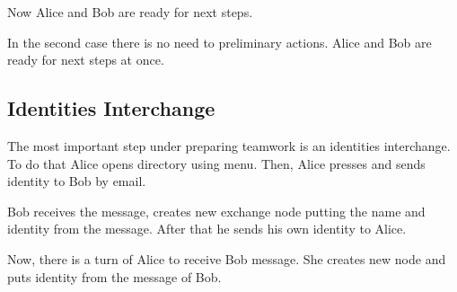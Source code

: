 \documentclass[a4paper,10pt,english]{sphinxmanual}
\begin{document}
Now Alice and Bob are ready for next steps.

In the second case there is no need to preliminary actions. Alice and Bob are ready for next steps at once.


\subsection{Identities Interchange}
\label{\detokenize{teamwork:identities-interchange}}
The most important step under preparing teamwork is an identities interchange. To do that
Alice opens  directory using  menu. Then,
Alice presses  and sends identity to Bob by email.

\noindent{}

\noindent{}

\noindent{}

\noindent{}

\noindent{}

\noindent{}

Bob receives the message, creates new exchange node putting the name and identity from the message.
After that he sends his own identity to Alice.

\noindent{}

\noindent{}

\noindent{}

\noindent{}

\noindent{}

Now, there is a turn of Alice to receive Bob message. She creates new node and puts identity
from the message of Bob.
\end{document}
